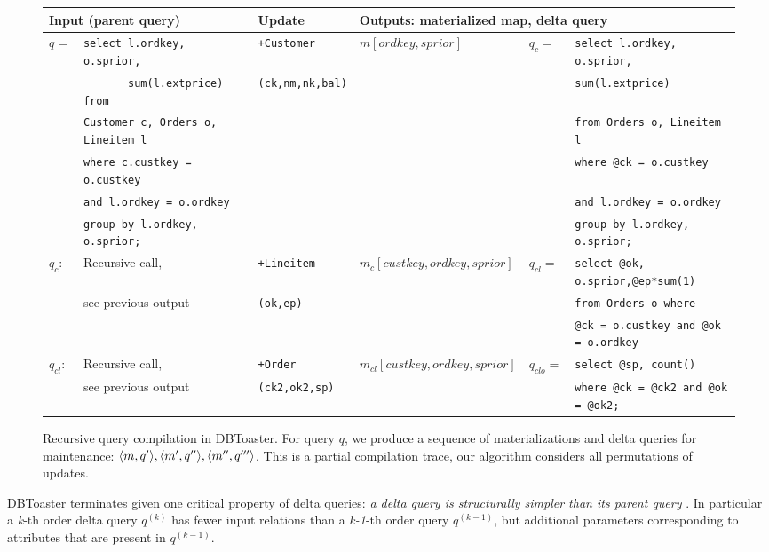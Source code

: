 \def \sql#1{{\scriptsize {\tt #1}}}
\begin{figure*}[htbp]

\vspace{-8mm}

\begin{tabular}{ll|l|l|ll}
\multicolumn{2}{l}{Input (parent query)}
& Update 
& \multicolumn{3}{l}{Outputs: materialized map, delta query}
\\
\hline
$q =$
& \sql{select l.ordkey, o.sprior,}
& \texttt{+Customer}
& $m[ordkey,sprior]$
& $q_c =$
& \sql{select l.ordkey, o.sprior,}
\\
& \sql{\ \ \ \ \ \ \ sum(l.extprice) from}
& \texttt{(ck,nm,nk,bal)}
& & & \sql{sum(l.extprice)}
\\
& \sql{Customer c, Orders o, Lineitem l}
& & & & \sql{from Orders o, Lineitem l}
\\
& \sql{where c.custkey = o.custkey}
& & & & \sql{where @ck = o.custkey} 
\\
& \sql{and l.ordkey = o.ordkey}
& & & & \sql{and l.ordkey = o.ordkey}
\\
& \sql{group by l.ordkey, o.sprior;}
& & & & \sql{group by l.ordkey, o.sprior;}
\\
\hline
$q_c$:
& Recursive call,
& \texttt{+Lineitem} 
& $m_c[custkey,ordkey,sprior]$
& $q_{cl} =$ & \sql{select @ok, o.sprior,@ep*sum(1)}
\\
& see previous output
& \texttt{(ok,ep)} & & & \sql{from Orders o where}
\\
& & & & & \sql{@ck = o.custkey and @ok = o.ordkey}
\\
\hline
$q_{cl}$:
& Recursive call,
& \texttt{+Order} 
& $m_{cl}[custkey,ordkey,sprior]$
& $q_{clo}=$ & \sql{select @sp, count()}
\\
& see previous output
& \texttt{(ck2,ok2,sp)}
& & & \sql{where @ck = @ck2 and @ok = @ok2;}
\end{tabular}
\caption{Recursive query compilation in DBToaster. For query $q$, we produce a
sequence of materializations and delta queries for maintenance: ${\langle m,q'\rangle},
{\langle m',q''\rangle}, {\langle m'',q'''\rangle}$. This is a partial compilation trace, our
algorithm considers all permutations of updates.}
\label{fig:compex}
\vspace{-4mm}
\end{figure*}

DBToaster terminates given one critical property of delta queries: \textit{a
delta query is structurally simpler than its parent query} \cite{koch-pods:10}.
In particular a \textit{k}-th order delta query $q^{(k)}$ has fewer input
relations than a \textit{k-1}-th order query $q^{(k-1)}$, but additional
parameters corresponding to attributes that are present in $q^{(k-1)}$.

